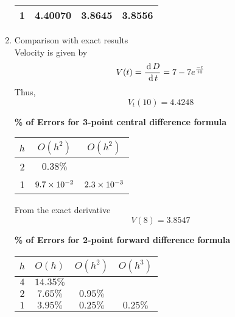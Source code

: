 \documentclass[12pt,class=book,crop=false]{standalone}
\begin{document}
\begin{soln}
\begin{enumerate}[label=(\alph*)]
\begin{table}[H]
\begin{tabular}{c*{3}{S[table-format=2.4]}}
                      1     & 4.40070  & 3.8645     & 3.8556     \\\bottomrule
                  \end{tabular}
              \end{table}
        \item Comparison with exact results\\
              Velocity is given by
              \[
                  V(t)=\frac{\,\mathrm{d}\, D}{\,\mathrm{d}\, t}=7-7e^{\frac{-t}{10}}
              \]
              Thus,
              \[
                  V_t(10) = 4.4248
              \]
              \begin{table}[H]
                  \centering
                  \textbf{\% of Errors for 3-point central difference formula\\}
                  \begin{tabular}{ccc}
                      \toprule
                      $ h $ & $ O(h^2) $    & $ O(h^2) $    \\\midrule
                      2     & $ 0.38 \% $   &               \\
                      1     & $ 9.7\times 10^{-2} $ & $ 2.3\times 10^{-3} $ \\\bottomrule
                  \end{tabular}
              \end{table}
              From the exact derivative
              \[
                  V(8) = 3.8547
              \]
              \begin{table}[H]
                  \centering
                  \textbf{\% of Errors for 2-point forward difference formula\\}
                  \begin{tabular}{cccc}
                      \toprule
                      $ h $ & $ O(h) $     & $ O(h^2) $   & $ O(h^3) $  \\\midrule
                      $ 4 $ & $ 14.35 \% $ &              &             \\
                      $ 2 $ & $ 7.65 \% $  & $  0.95 \% $ &             \\
                      $ 1 $ & $ 3.95 \% $  & $ 0.25 \% $  & $ 0.25 \% $ \\\bottomrule
                  \end{tabular}
              \end{table}
    \end{enumerate}
\end{soln}
\end{document}
